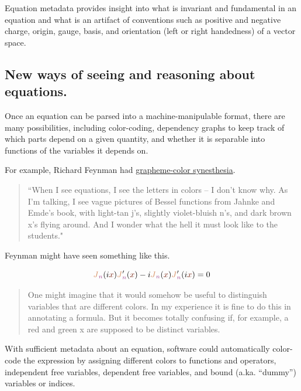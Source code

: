 \documentclass[12pt,letterpaper]{article}
\begin{document}
Equation metadata provides insight into what is invariant and fundamental in an equation
and what is an artifact of conventions such as positive and negative charge,
origin, gauge, basis, and orientation (left or right handedness) of a vector space.

\subsection{New ways of seeing and reasoning about equations.}

Once an equation can be parsed into a machine-manipulable format,
there are many possibilities,
including color-coding,
dependency graphs to keep track of which parts depend on a given quantity,
and whether it is separable into functions of the variables it depends on.

For example, Richard Feynman had
\href{https://en.wikipedia.org/wiki/Grapheme-color_synesthesia}
{grapheme-color synesthesia}.

\begin{quote}
``When I see equations, I see the letters in colors – I don't know why.
As I'm talking,
I see vague pictures of Bessel functions from Jahnke and Emde's book,
with light-tan j's,
slightly violet-bluish n's,
and dark brown x's flying around.
And I wonder what the hell it must look like to the students."
\end{quote}

Feynman might have seen something like this.

\newcommand{\nF}{\textcolor{DarkOrchid}{n}}
\newcommand{\xF}{\textcolor{Brown}{x}}
\newcommand{\JF}{\textcolor{Tan}{J}}
\boldmath
\[
\JF_{\nF}(i \xF) \JF_{\nF}'(\xF) - i \JF_{\nF}(\xF) \JF_{\nF}' (i \xF) = 0
\]
\unboldmath


\begin{quote}
One might imagine that it would somehow be useful to distinguish variables that
are different colors. In my experience it is fine to do this in annotating a
formula. But it becomes totally confusing if, for example, a red and green x
are supposed to be distinct variables.
\end{quote}


\label{color-coding}
With sufficient metadata about an equation,
software could automatically color-code the expression by assigning different colors to
functions and operators,
independent free variables,
dependent free variables,
and bound (a.ka. ``dummy'') variables or indices.
\end{document}
